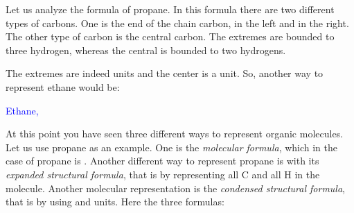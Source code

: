 \documentclass[main.tex]{subfiles}
\begin{document}
\begin{description}
\newpage
\item[\docfilehook{  Alkanes contain \ce{CH3} and \ce{CH2} units}{Alkanes contain \ce{CH3} and \ce{CH2} units}] Let us analyze the formula of propane. In this formula there are two different types of carbons. One is the end of the chain carbon, in the left and in the right. The other type of carbon is the central carbon. The extremes are bounded to three hydrogen, whereas the central is bounded to two hydrogens.
\begin{center} \end{center}
The extremes are indeed  units and the center is a  unit. So, another way to represent ethane would be:
\begin{center} \hspace{0.5cm}\textcolor{blue}{Ethane, }\end{center}
At this point you have seen three different ways to represent organic molecules. Let us use propane as an example. One is the  \emph{molecular formula}, which in the case of propane is . Another different way to represent propane is with its \emph{expanded structural formula}, that is by representing all C and all H in the molecule. Another molecular representation is the \emph{condensed structural formula}, that is by using  and  units. Here the three formulas:
\begin{center}
\end{center}
\end{description}
\end{document}
